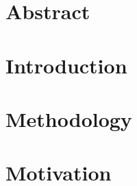 \documentclass[a4paper,10pt]{article}
\author{\me}
\begin{document}


\normalsize


%

%

\section*{Abstract}\label{chapter:abstract}


%



\section{Introduction}\label{chapter:introduction}
\setcounter{page}{0}


\newpage
\section{Methodology}\label{chapter:methodology}


\section{Motivation}\label{chapter:motivation}

\end{document}

